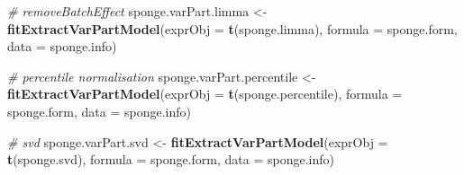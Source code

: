 \documentclass[]{book}
\newenvironment{Shaded}{\begin{snugshade}}{\end{snugshade}}
\newcommand{\KeywordTok}[1]{\textcolor[rgb]{0.13,0.29,0.53}{\textbf{#1}}}
\newcommand{\DataTypeTok}[1]{\textcolor[rgb]{0.13,0.29,0.53}{#1}}
\newcommand{\StringTok}[1]{\textcolor[rgb]{0.31,0.60,0.02}{#1}}
\newcommand{\CommentTok}[1]{\textcolor[rgb]{0.56,0.35,0.01}{\textit{#1}}}
\newcommand{\NormalTok}[1]{#1}
\begin{document}
\begin{Shaded}
\begin{Highlighting}[]
\CommentTok{# removeBatchEffect}
\NormalTok{sponge.varPart.limma <-}\StringTok{ }\KeywordTok{fitExtractVarPartModel}\NormalTok{(}\DataTypeTok{exprObj =} \KeywordTok{t}\NormalTok{(sponge.limma), }
                                               \DataTypeTok{formula =}\NormalTok{ sponge.form, }
                                               \DataTypeTok{data =}\NormalTok{ sponge.info)}

\CommentTok{# percentile normalisation}
\NormalTok{sponge.varPart.percentile <-}\StringTok{ }\KeywordTok{fitExtractVarPartModel}\NormalTok{(}\DataTypeTok{exprObj =} \KeywordTok{t}\NormalTok{(sponge.percentile), }
                                                    \DataTypeTok{formula =}\NormalTok{ sponge.form, }
                                                    \DataTypeTok{data =}\NormalTok{ sponge.info)}

\CommentTok{# svd}
\NormalTok{sponge.varPart.svd <-}\StringTok{ }\KeywordTok{fitExtractVarPartModel}\NormalTok{(}\DataTypeTok{exprObj =} \KeywordTok{t}\NormalTok{(sponge.svd), }
                                             \DataTypeTok{formula =}\NormalTok{ sponge.form, }
                                             \DataTypeTok{data =}\NormalTok{ sponge.info)}
\end{Highlighting}
\end{Shaded}
\end{document}
